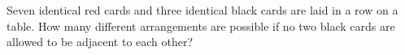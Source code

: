 Seven identical red cards and three identical black cards are laid in a row on a table. How many different arrangements are possible if no two black cards are allowed to be adjacent to each other?

